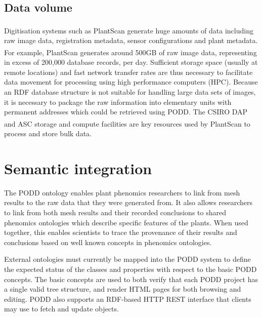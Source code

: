 \documentclass{llncs}
\begin{document}
\subsection{Data volume}
Digitisation systems such as PlantScan\textsuperscript{\texttrademark} generate
huge amounts of data including
raw image data, registration metadata, sensor configurations and plant metadata.
For example, PlantScan\textsuperscript{\texttrademark} generates around 500GB of
raw image data, representing
in excess of 200,000 database records, per day. Sufficient storage space
(usually at remote locations) and fast network transfer rates are thus
necessary to facilitate data movement for processing using high performance
computers (HPC). Because an RDF database structure is not suitable for handling
large data sets of images, it is necessary to package the raw information into
elementary units with permanent addresses which could be retrieved using PODD. 
The CSIRO DAP \cite{DAP} and ASC storage and compute facilities \cite{ASC} are key
resources used by PlantScan\textsuperscript{\texttrademark} to
process and store bulk data.


\section{Semantic integration}
The PODD ontology enables plant phenomics researchers to link from mesh results
to the raw data that they were generated from. It also allows researchers to
link from both mesh results and their recorded conclusions to shared phenomics
ontologies which describe specific features of the plants. When used together,
this enables scientists to trace the provenance of their results and conclusions
based on well known concepts in phenomics ontologies.




External ontologies must currently be mapped into the PODD system to define the
expected status of the classes and properties with respect to the basic PODD
concepts. The basic concepts are used to both verify that each PODD project has
a single valid tree structure, and render HTML pages for both browsing and
editing. PODD also supports an RDF-based HTTP REST interface that clients may
use to fetch and update objects.
\end{document}

